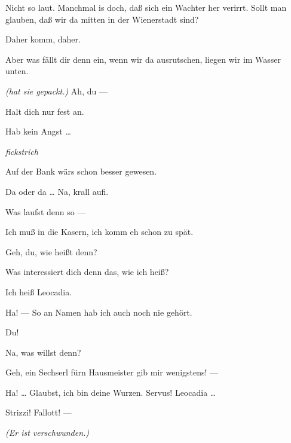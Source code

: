 \documentclass[
	final,
	a4paper,
	ngerman,
	mpinclude = true, %
	twoside = true,
	open = right,
	cleardoublepage = plain,
	DIV = 13,
	BCOR = 1cm,
	titlepage = firstiscover,
	]{scrbook}
\newcommand{\direction}[1]{\textit{(#1)}}
\newcommand{\hiat}{%
	\begin{center}
		\tiny
		\raisebox{0.5ex}{\rule{0.3\linewidth}{0.4pt}}
		\textit{fickstrich}
		\raisebox{0.5ex}{\rule{0.3\linewidth}{0.4pt}}
	\end{center}
}
\newcommand{\thecharacter}[1]{\textup{\textsc{#1}}\xspace}
\newcommand{\thedirne}{\thecharacter{Dirne}}
\newcommand{\thesoldat}{\thecharacter{Soldatin}}
\newcommand{\character}[1]{\item[#1:]}
\newcommand{\dirne}{\character{\thedirne}}
\newcommand{\soldat}{\character{\thesoldat}}
\begin{document}
\begin{play}
	\dirne
	Nicht so laut. Manchmal is doch, daß sich ein Wachter her verirrt. Sollt man glauben, daß wir da mitten in der Wienerstadt sind?

	\soldat
	Daher komm, daher.

	\dirne
	Aber was fällt dir denn ein, wenn wir da ausrutschen, liegen wir im Wasser unten.

	\soldat
	\direction{hat sie gepackt.} Ah, du ---

	\dirne
	Halt dich nur fest an.

	\soldat
	Hab kein Angst \ldots{}

	\hiat

	\dirne
	Auf der Bank wärs schon besser gewesen.

	\soldat
	Da oder da \ldots{} Na, krall aufi.

	\dirne
	Was laufst denn so ---

	\soldat
	Ich muß in die Kasern, ich komm eh schon zu spät.

	\dirne
	Geh, du, wie heißt denn?

	\soldat
	Was interessiert dich denn das, wie ich heiß?

	\dirne
	Ich heiß Leocadia.

	\soldat
	Ha! --- So an Namen hab ich auch noch nie gehört.

	\dirne
	Du!

	\soldat
	Na, was willst denn?

	\dirne
	Geh, ein Sechserl fürn Hausmeister gib mir wenigstens! ---

	\soldat
	Ha! \ldots{} Glaubst, ich bin deine Wurzen. Servus! Leocadia \ldots{}

	\dirne
	Strizzi! Fallott! ---

	\direction{Er ist verschwunden.}

\end{play}
\end{document}
